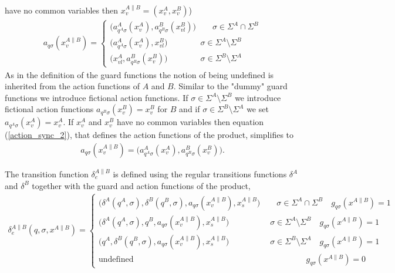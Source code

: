 \documentclass{article}
\begin{document}
have no common variables then $x^{A\|B}_v=(x^{A}_v,x^{B}_v)$)
\begin{eqnarray}\label{action_sync_2}
a_{q \sigma}(x^{A\|B}_v)=\left\{
\begin{array}{ll}
 \big(a^A_{q^A \sigma}(x^{A}_v), a^B_{q^B \sigma}(x^{B}_{vl})\big)\quad\quad\sigma\in \Sigma^A \cap \Sigma^B\\
\big(a^A_{q^A \sigma}(x^{A}_v), x^{B}_{vl}\big)\quad\quad\quad\quad\sigma\in \Sigma^A \setminus \Sigma^B\\
\big(x^{A}_{vl}, a^B_{q^B
\sigma}(x^{B}_v)\big)\quad\quad\quad\quad\sigma\in \Sigma^B
\setminus \Sigma^A
\end{array}\right.
\end{eqnarray}
As in the definition of the guard functions the notion of being
undefined is inherited from the action functions of $A$ and $B$.
Similar to the "dummy" guard functions we introduce fictional
action functions. If $\sigma\in \Sigma^A \setminus \Sigma^B$ we
introduce fictional action functions $a_{q^B\sigma}(x^B_v)=x^B_v$
for $B$ and if $\sigma\in\Sigma^B\setminus \Sigma^A$ we set
$a_{q^A\sigma}(x^A_v)=x^A_v$. If $x^{A}_v$ and $x^{B}_v$ have no
common variables then equation (\ref{action_sync_2}), that defines
the action functions of the product, simplifies to
\begin{eqnarray}
a_{q \sigma}(x^{A\|B}_v)=
 \big(a^A_{q^A \sigma}(x^{A}_v), a^B_{q^B \sigma}(x^{B}_v)\big).
\end{eqnarray}


 The transition function
$\delta^{A\|B}_e$ is defined using the regular transitions
functions $\delta^A$ and $\delta^B$ together with the guard and
action functions of the product,
\begin{eqnarray}
\delta^{A\|B}_{e}(q,\sigma,x^{A\|B})=\left\{
\begin{array}{ll}
\big(\delta^A(q^A,\sigma),\delta^B(q^B,\sigma),a_{q \sigma}(x^{A\|B}_v), x^{A\|B}_s \big) \quad\quad \sigma\in \Sigma^A \cap \Sigma^B \quad g_{q \sigma}(x^{A\|B})=1\\
\big(\delta^A(q^A,\sigma),q^B,a_{q \sigma}(x^{A\|B}_v), x^{A\|B}_s\big) \quad\quad\quad\quad\quad \sigma\in \Sigma^A \setminus \Sigma^B \quad g_{q \sigma}(x^{A\|B})=1\\
\big(q^A,\delta^B(q^B,\sigma),a_{q \sigma}(x^{A\|B}_v), x^{A\|B}_s\big) \quad\quad\quad\quad\quad \sigma\in \Sigma^B \setminus \Sigma^A \quad g_{q \sigma}(x^{A\|B})=1\\
\textrm{
undefined}\quad\quad\quad\quad\quad\quad\quad\quad\quad\quad\quad\quad\quad\quad\quad\quad\quad\quad\quad\quad\quad
g_{q\sigma}(x^{A\|B})=0
\end{array}\right.
\end{eqnarray}
\end{document}
